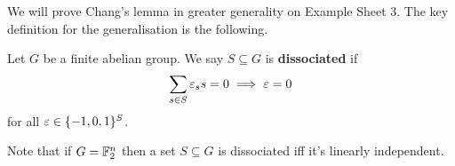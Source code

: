 \documentclass{article}
\begin{document}
We will prove Chang's lemma in greater generality on Example Sheet 3. The key definition for the generalisation is the following.

\begin{ndef}
  Let $G$ be a finite abelian group. We say $S \subseteq G$ is {\bf dissociated} if
  $$\sum_{s \in S} \varepsilon_s s = 0 \implies \varepsilon = 0$$
  for all $\varepsilon \in \{-1, 0, 1\}^S$.
\end{ndef}

Note that if $G = \mathbb F_2^n$ then a set $S \subseteq G$ is dissociated iff it's linearly independent.
\end{document}
